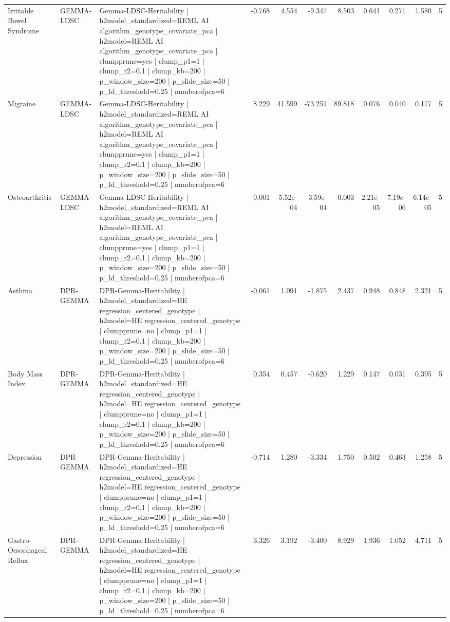 \begin{landscape}
\begin{longtable}{p{2.4cm}p{1.8cm}p{6.0cm}rrrrrrrr}
Irritable Bowel Syndrome & GEMMA-LDSC & Gemma-LDSC-Heritability | h2model\_standardized=REML AI algorithm\_genotype\_covariate\_pca | h2model=REML AI algorithm\_genotype\_covariate\_pca | clumpprune=yes | clump\_p1=1 | clump\_r2=0.1 | clump\_kb=200 | p\_window\_size=200 | p\_slide\_size=50 | p\_ld\_threshold=0.25 | numberofpca=6 & -0.768 & 4.554 & -9.347 & 8.503 & 0.641 & 0.271 & 1.580 & 5 \\
Migraine & GEMMA-LDSC & Gemma-LDSC-Heritability | h2model\_standardized=REML AI algorithm\_genotype\_covariate\_pca | h2model=REML AI algorithm\_genotype\_covariate\_pca | clumpprune=yes | clump\_p1=1 | clump\_r2=0.1 | clump\_kb=200 | p\_window\_size=200 | p\_slide\_size=50 | p\_ld\_threshold=0.25 | numberofpca=6 & 8.229 & 41.599 & -73.251 & 89.818 & 0.076 & 0.040 & 0.177 & 5 \\
Osteoarthritis & GEMMA-LDSC & Gemma-LDSC-Heritability | h2model\_standardized=REML AI algorithm\_genotype\_covariate\_pca | h2model=REML AI algorithm\_genotype\_covariate\_pca | clumpprune=yes | clump\_p1=1 | clump\_r2=0.1 | clump\_kb=200 | p\_window\_size=200 | p\_slide\_size=50 | p\_ld\_threshold=0.25 | numberofpca=6 & 0.001 & 5.52e-04 & 3.59e-04 & 0.003 & 2.21e-05 & 7.19e-06 & 6.14e-05 & 5 \\
Asthma & DPR-GEMMA & DPR-Gemma-Heritability | h2model\_standardized=HE regression\_centered\_genotype | h2model=HE regression\_centered\_genotype | clumpprune=no | clump\_p1=1 | clump\_r2=0.1 | clump\_kb=200 | p\_window\_size=200 | p\_slide\_size=50 | p\_ld\_threshold=0.25 | numberofpca=6 & -0.061 & 1.091 & -1.875 & 2.437 & 0.948 & 0.848 & 2.321 & 5 \\
Body Mass Index & DPR-GEMMA & DPR-Gemma-Heritability | h2model\_standardized=HE regression\_centered\_genotype | h2model=HE regression\_centered\_genotype | clumpprune=no | clump\_p1=1 | clump\_r2=0.1 | clump\_kb=200 | p\_window\_size=200 | p\_slide\_size=50 | p\_ld\_threshold=0.25 | numberofpca=6 & 0.354 & 0.457 & -0.620 & 1.229 & 0.147 & 0.031 & 0.395 & 5 \\
Depression & DPR-GEMMA & DPR-Gemma-Heritability | h2model\_standardized=HE regression\_centered\_genotype | h2model=HE regression\_centered\_genotype | clumpprune=no | clump\_p1=1 | clump\_r2=0.1 | clump\_kb=200 | p\_window\_size=200 | p\_slide\_size=50 | p\_ld\_threshold=0.25 | numberofpca=6 & -0.714 & 1.280 & -3.334 & 1.750 & 0.502 & 0.463 & 1.258 & 5 \\
Gastro-Oesophageal Reflux & DPR-GEMMA & DPR-Gemma-Heritability | h2model\_standardized=HE regression\_centered\_genotype | h2model=HE regression\_centered\_genotype | clumpprune=no | clump\_p1=1 | clump\_r2=0.1 | clump\_kb=200 | p\_window\_size=200 | p\_slide\_size=50 | p\_ld\_threshold=0.25 | numberofpca=6 & 3.326 & 3.192 & -3.400 & 8.929 & 1.936 & 1.052 & 4.711 & 5 \\

\end{longtable}
\end{landscape}
